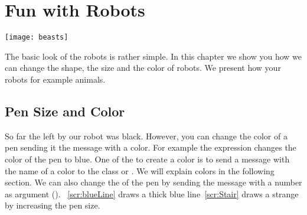 \ifx\wholebook\relax\else



\fi


\chapter{Fun with Robots}\label{cha:custo}

\begin{chapterfigure}
\texttt{[image: beasts]}
\end{chapterfigure}

The basic look of the robots is rather simple. In this chapter we show you how we can change the shape, the size and the color of robots. We present how  your robots  for example  animals.  


\section{Pen Size and Color}
So far the  left by our robot was black. However, you can change the color of a  pen  sending it the message  with a color. For example the expression  changes the color of the pen to blue. \add{\paragraph
}
One of the  to create a color is to send a message with the name of a color to the class    or . We will explain colors in the following section. \add{\paragraph
}
We can also change the  of the  pen by sending the message  with a number as argument (). \add{\paragraph
}
~\ref{scr:blueLine} draws a thick blue line~\ref{scr:Stair} draws a strange  by  increasing  the pen size.

